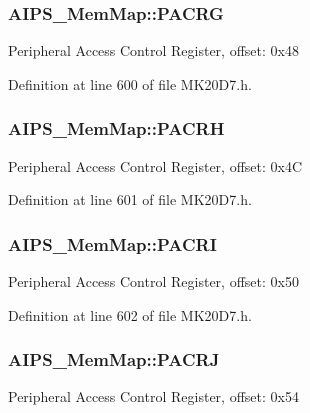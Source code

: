 \subsubsection[{\texorpdfstring{P\+A\+C\+RG}{PACRG}}]{ A\+I\+P\+S\+\_\+\+Mem\+Map\+::\+P\+A\+C\+RG}\hypertarget{struct_a_i_p_s___mem_map_a7eb01b8a7f5cbdd90e2cfc1103dc818e}{}\label{struct_a_i_p_s___mem_map_a7eb01b8a7f5cbdd90e2cfc1103dc818e}
Peripheral Access Control Register, offset\+: 0x48 

Definition at line 600 of file M\+K20\+D7.\+h.

\subsubsection[{\texorpdfstring{P\+A\+C\+RH}{PACRH}}]{ A\+I\+P\+S\+\_\+\+Mem\+Map\+::\+P\+A\+C\+RH}\hypertarget{struct_a_i_p_s___mem_map_af4ac7a20bb8f381f2f77e21ed14d5e91}{}\label{struct_a_i_p_s___mem_map_af4ac7a20bb8f381f2f77e21ed14d5e91}
Peripheral Access Control Register, offset\+: 0x4C 

Definition at line 601 of file M\+K20\+D7.\+h.

\subsubsection[{\texorpdfstring{P\+A\+C\+RI}{PACRI}}]{ A\+I\+P\+S\+\_\+\+Mem\+Map\+::\+P\+A\+C\+RI}\hypertarget{struct_a_i_p_s___mem_map_a75787ffd284dd47814093fbe8d28232d}{}\label{struct_a_i_p_s___mem_map_a75787ffd284dd47814093fbe8d28232d}
Peripheral Access Control Register, offset\+: 0x50 

Definition at line 602 of file M\+K20\+D7.\+h.

\subsubsection[{\texorpdfstring{P\+A\+C\+RJ}{PACRJ}}]{ A\+I\+P\+S\+\_\+\+Mem\+Map\+::\+P\+A\+C\+RJ}\hypertarget{struct_a_i_p_s___mem_map_aa8170562fdbb48e8ade84f0992479a98}{}\label{struct_a_i_p_s___mem_map_aa8170562fdbb48e8ade84f0992479a98}
Peripheral Access Control Register, offset\+: 0x54 

